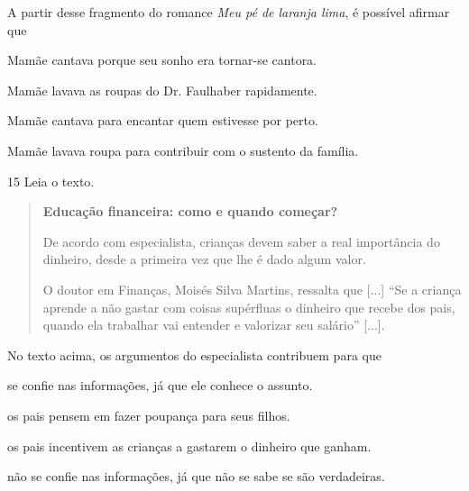 A partir desse fragmento do romance \emph{Meu pé de laranja lima}, é
possível afirmar que

\begin{escolha}
\item Mamãe cantava porque seu sonho era tornar-se cantora.

\item Mamãe lavava as roupas do Dr. Faulhaber rapidamente.

\item Mamãe cantava para encantar quem estivesse por perto.

\item Mamãe lavava roupa para contribuir com o sustento da família.
\end{escolha}


\pagebreak
\num{15} Leia o texto.

\begin{quote}
\textbf{Educação financeira: como e quando começar?}

De acordo com especialista, crianças devem saber a real importância do
dinheiro, desde a primeira vez que lhe é dado algum valor.

O doutor em Finanças, Moisés Silva Martins, ressalta que {[}...{]} ``Se
a criança aprende a não gastar com coisas supérfluas o dinheiro que
recebe dos pais, quando ela trabalhar vai entender e valorizar seu
salário'' {[}...{]}.

\end{quote}

No texto acima, os argumentos do especialista contribuem para que

\begin{escolha}
\item se confie nas informações, já que ele conhece o assunto.

\item os pais pensem em fazer poupança para seus filhos.

\item os pais incentivem as crianças a gastarem o dinheiro que ganham.

\item não se confie nas informações, já que não se sabe se são verdadeiras.
\end{escolha}

